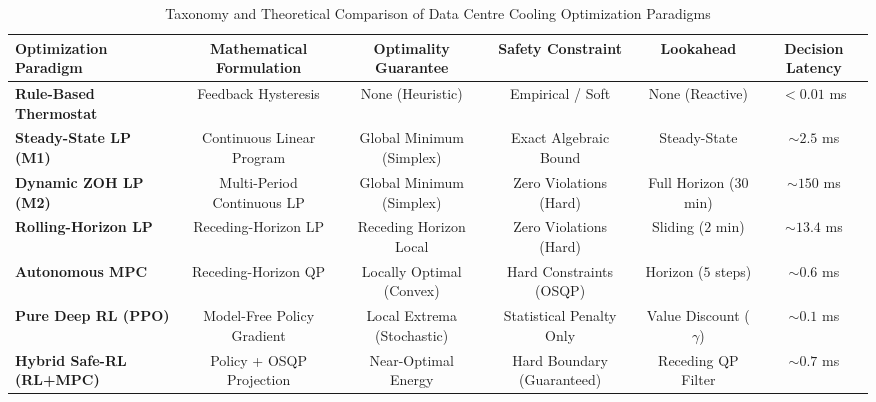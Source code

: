 \begin{table}[t]
\centering
\caption{Taxonomy and Theoretical Comparison of Data Centre Cooling Optimization Paradigms}
\label{tab:paradigm_taxonomy}
\small
\begin{tabular}{lccccc}
\hline
\textbf{Optimization Paradigm} & \textbf{Mathematical Formulation} & \textbf{Optimality Guarantee} & \textbf{Safety Constraint} & \textbf{Lookahead} & \textbf{Decision Latency} \\
\hline
\textbf{Rule-Based Thermostat} & Feedback Hysteresis & None (Heuristic) & Empirical / Soft & None (Reactive) & $<0.01$ ms \\
\textbf{Steady-State LP (M1)} & Continuous Linear Program & Global Minimum (Simplex) & Exact Algebraic Bound & Steady-State & $\sim 2.5$ ms \\
\textbf{Dynamic ZOH LP (M2)} & Multi-Period Continuous LP & Global Minimum (Simplex) & Zero Violations (Hard) & Full Horizon (30 min) & $\sim 150$ ms \\
\textbf{Rolling-Horizon LP} & Receding-Horizon LP & Receding Horizon Local & Zero Violations (Hard) & Sliding ($2$ min) & $\sim 13.4$ ms \\
\textbf{Autonomous MPC} & Receding-Horizon QP & Locally Optimal (Convex) & Hard Constraints (OSQP) & Horizon ($5$ steps) & $\sim 0.6$ ms \\
\textbf{Pure Deep RL (PPO)} & Model-Free Policy Gradient & Local Extrema (Stochastic) & Statistical Penalty Only & Value Discount ($\gamma$) & $\sim 0.1$ ms \\
\textbf{Hybrid Safe-RL (RL+MPC)} & Policy + OSQP Projection & Near-Optimal Energy & Hard Boundary (Guaranteed) & Receding QP Filter & $\sim 0.7$ ms \\
\hline
\end{tabular}
\end{table}
